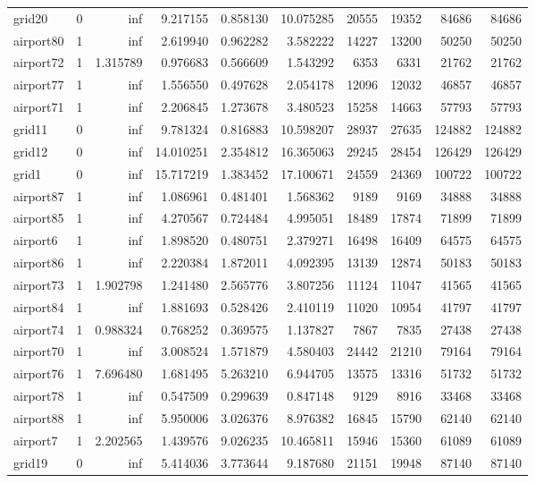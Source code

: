 \begin{longtable}{|l|r|r|r|r|r|r|r|r|r|}
grid20 & 0 & inf & 9.217155 & 0.858130 & 10.075285 & 20555 & 19352 & 84686 & 84686 \\
airport80 & 1 & inf & 2.619940 & 0.962282 & 3.582222 & 14227 & 13200 & 50250 & 50250 \\
airport72 & 1 & 1.315789 & 0.976683 & 0.566609 & 1.543292 & 6353 & 6331 & 21762 & 21762 \\
airport77 & 1 & inf & 1.556550 & 0.497628 & 2.054178 & 12096 & 12032 & 46857 & 46857 \\
airport71 & 1 & inf & 2.206845 & 1.273678 & 3.480523 & 15258 & 14663 & 57793 & 57793 \\
grid11 & 0 & inf & 9.781324 & 0.816883 & 10.598207 & 28937 & 27635 & 124882 & 124882 \\
grid12 & 0 & inf & 14.010251 & 2.354812 & 16.365063 & 29245 & 28454 & 126429 & 126429 \\
grid1 & 0 & inf & 15.717219 & 1.383452 & 17.100671 & 24559 & 24369 & 100722 & 100722 \\
airport87 & 1 & inf & 1.086961 & 0.481401 & 1.568362 & 9189 & 9169 & 34888 & 34888 \\
airport85 & 1 & inf & 4.270567 & 0.724484 & 4.995051 & 18489 & 17874 & 71899 & 71899 \\
airport6 & 1 & inf & 1.898520 & 0.480751 & 2.379271 & 16498 & 16409 & 64575 & 64575 \\
airport86 & 1 & inf & 2.220384 & 1.872011 & 4.092395 & 13139 & 12874 & 50183 & 50183 \\
airport73 & 1 & 1.902798 & 1.241480 & 2.565776 & 3.807256 & 11124 & 11047 & 41565 & 41565 \\
airport84 & 1 & inf & 1.881693 & 0.528426 & 2.410119 & 11020 & 10954 & 41797 & 41797 \\
airport74 & 1 & 0.988324 & 0.768252 & 0.369575 & 1.137827 & 7867 & 7835 & 27438 & 27438 \\
airport70 & 1 & inf & 3.008524 & 1.571879 & 4.580403 & 24442 & 21210 & 79164 & 79164 \\
airport76 & 1 & 7.696480 & 1.681495 & 5.263210 & 6.944705 & 13575 & 13316 & 51732 & 51732 \\
airport78 & 1 & inf & 0.547509 & 0.299639 & 0.847148 & 9129 & 8916 & 33468 & 33468 \\
airport88 & 1 & inf & 5.950006 & 3.026376 & 8.976382 & 16845 & 15790 & 62140 & 62140 \\
airport7 & 1 & 2.202565 & 1.439576 & 9.026235 & 10.465811 & 15946 & 15360 & 61089 & 61089 \\
grid19 & 0 & inf & 5.414036 & 3.773644 & 9.187680 & 21151 & 19948 & 87140 & 87140 \\

\end{longtable}
